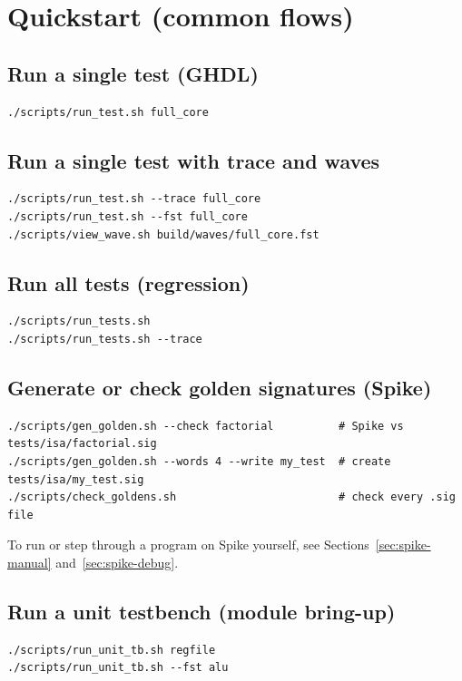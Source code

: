 \section{Quickstart (common flows)}

\subsection{Run a single test (GHDL)}
\begin{lstlisting}[style=minrv]
./scripts/run_test.sh full_core
\end{lstlisting}

\subsection{Run a single test with trace and waves}
\begin{lstlisting}[style=minrv]
./scripts/run_test.sh --trace full_core
./scripts/run_test.sh --fst full_core
./scripts/view_wave.sh build/waves/full_core.fst
\end{lstlisting}

\subsection{Run all tests (regression)}
\begin{lstlisting}[style=minrv]
./scripts/run_tests.sh
./scripts/run_tests.sh --trace
\end{lstlisting}

\subsection{Generate or check golden signatures (Spike)}
\begin{lstlisting}[style=minrv]
./scripts/gen_golden.sh --check factorial          # Spike vs tests/isa/factorial.sig
./scripts/gen_golden.sh --words 4 --write my_test  # create tests/isa/my_test.sig
./scripts/check_goldens.sh                         # check every .sig file
\end{lstlisting}
To run or step through a program on Spike yourself, see
Sections~\ref{sec:spike-manual} and~\ref{sec:spike-debug}.

\subsection{Run a unit testbench (module bring-up)}
\begin{lstlisting}[style=minrv]
./scripts/run_unit_tb.sh regfile
./scripts/run_unit_tb.sh --fst alu
\end{lstlisting}

